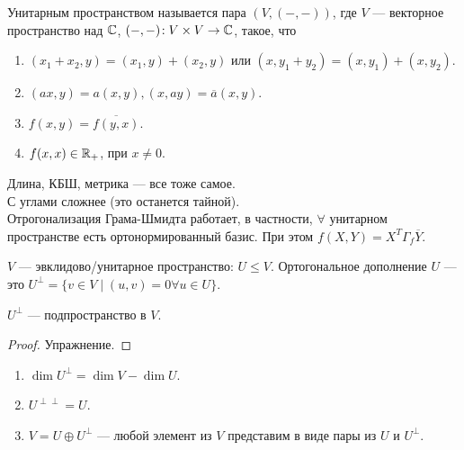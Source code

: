 \begin{definition}
    Унитарным пространством называется пара $(V, (-,-))$, где  $V$ --- векторное пространство над  $\mathbb{C}$,  $(-, -)\!: V \times V \to \mathbb{C}$, такое, что 
     \begin{enumerate}
     \item $(x_1 + x_2, y) = (x_1, y) + (x_2, y)$ или $(x, y_1 + y_2) = (x, y_1) + (x, y_2)$.
     \item $(ax, y) = a(x, y), (x, ay) = \overline{a}(x, y)$.
     \item $f(x, y) = \overline{f(y, x)}$.
     \item  $f(x, x) \in \mathbb{R}_+$, при  $x \neq 0$.
    \end{enumerate}
    Длина, КБШ, метрика --- все тоже самое.
\\
    С углами сложнее (это останется тайной).
    \\
    Отрогонализация Грама-Шмидта работает, в частности, $\forall$ унитарном пространстве есть ортонормированный базис. При этом $f(X, Y) = X^T\Gamma_f\overline{Y}$.
\end{definition}
 \begin{definition}
     $V$ --- эвклидово/унитарное пространство:  $U \le V$. Ортогональное дополнение $U$ --- это $U^\perp = \{ v \in V \mid (u,v) = 0 \forall u \in U\}$.
 \end{definition}
 \begin{statement}
     $U^\perp$ --- подпространство в  $V$.
 \end{statement}
 \begin{proof}
     Упражнение.
 \end{proof}
 \begin{theorem}
     \slashn
      \begin{enumerate}
          \item $\dim U^\perp = \dim V - \dim U$.
          \item  $U^{\perp\perp} = U$.
          \item  $V = U \oplus U^\perp$ --- любой элемент из $V$ представим в виде пары из  $U$ и  $U^\perp$.
     \end{enumerate}
 \end{theorem}
